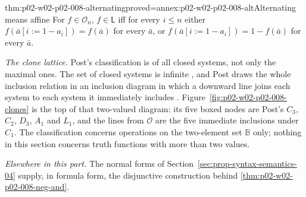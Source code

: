 \begin{hblemma}{thm:p02-w02-p02-008-alternating}{proved=annex:p02-w02-p02-008-alt}{Alternating means affine}
For \(f\in\mathcal O_n\), \(f\in\mathsf L\) iff for every \(i\leq n\) either
\(f(\bar a[i{:=}1-a_i])=f(\bar a)\) for every \(\bar a\), or
\(f(\bar a[i{:=}1-a_i])=1-f(\bar a)\) for every \(\bar a\).
\end{hblemma}

\emph{The clone lattice.}  Post's classification is of all closed systems,
not only the maximal ones.  The set of closed systems is infinite
\cite[\S\,25, p.~96]{Post1941}, and Post draws the whole inclusion relation in
an inclusion diagram in which a downward line joins each system to each
system it immediately includes \cite[\S\,25, p.~100]{Post1941}.
Figure~\ref{fig:p02-w02-p02-008-clones} is the top of that two-valued
diagram: its five boxed nodes are Post's \(C_3\), \(C_2\), \(D_3\), \(A_1\)
and \(L_1\), and the lines from \(\mathcal O\) are the five immediate
inclusions under \(C_1\).  The classification concerns operations on the
two-element set \(\mathbb B\) only; nothing in this section concerns
truth functions with more than two values.

\emph{Elsewhere in this part.}  The normal forms of
Section~\ref{sec:prop-syntax-semantics-04} supply, in formula form, the
disjunctive construction behind \cref{thm:p02-w02-p02-008-neg-and}.
